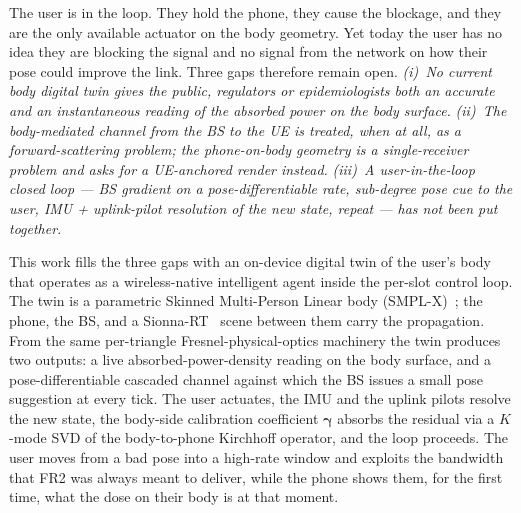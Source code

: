 \documentclass[journal,twocolumn,10pt]{IEEEtran}
\theoremstyle{plain}
\theoremstyle{definition}
\theoremstyle{remark}
\newcommand{\gammab}{\bm{\gamma}}
\begin{document}
The user is in the loop. They hold the phone, they cause the
blockage, and they are the only available actuator on the body
geometry. Yet today the user has no idea they are blocking the
signal and no signal from the network on how their pose could
improve the link. Three gaps therefore remain open.
\emph{(i)~No current body digital twin gives the public, regulators
or epidemiologists both an accurate and an instantaneous reading of
the absorbed power on the body surface.}
\emph{(ii)~The body-mediated channel from the BS to the UE is
treated, when at all, as a forward-scattering problem; the
phone-on-body geometry is a single-receiver problem and asks for
a UE-anchored render instead.}
\emph{(iii)~A user-in-the-loop closed loop --- BS gradient on a
pose-differentiable rate, sub-degree pose cue to the user, IMU
+ uplink-pilot resolution of the new state, repeat --- has not
been put together.}

This work fills the three gaps with an on-device digital twin of
the user's body that operates as a wireless-native intelligent
agent inside the per-slot control loop. The twin is a parametric
Skinned Multi-Person Linear body (SMPL-X)~\cite{SMPLX2019}; the
phone, the BS, and a Sionna-RT~\cite{Hoydis2023Sionna} scene
between them carry the propagation. From the same per-triangle
Fresnel-physical-optics machinery the twin produces two outputs:
a live absorbed-power-density reading on the body surface, and a
pose-differentiable cascaded channel against which the BS issues a
small pose suggestion at every tick. The user actuates, the IMU
and the uplink pilots resolve the new state, the body-side
calibration coefficient $\gammab$ absorbs the residual via a
$K$-mode SVD of the body-to-phone Kirchhoff operator, and the loop
proceeds. The user moves from a bad pose into a high-rate window
and exploits the bandwidth that FR2 was always meant to deliver,
while the phone shows them, for the first time, what the dose on
their body is at that moment.
\end{document}
